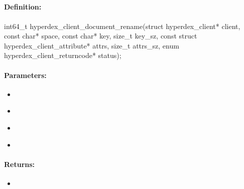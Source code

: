 \pagebreak
\subsection{}
\label{api:c:document_rename}


\paragraph{Definition:}
\begin{ccode}
int64_t hyperdex_client_document_rename(struct hyperdex_client* client,
        const char* space,
        const char* key, size_t key_sz,
        const struct hyperdex_client_attribute* attrs, size_t attrs_sz,
        enum hyperdex_client_returncode* status);
\end{ccode}

\paragraph{Parameters:}
\begin{itemize}[noitemsep]
\item {}\\

\item {}\\

\item {}\\

\item {}\\

\end{itemize}

\paragraph{Returns:}
\begin{itemize}[noitemsep]
\item {}\\

\end{itemize}

